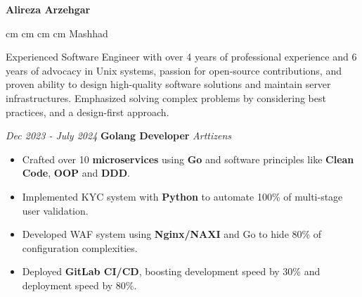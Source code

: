 \documentclass{engineercv}
\begin{document}
\begin{center}
  \textbf{\fontsize{24 pt}{24 pt}\selectfont Alireza Arzehgar}

  \vspace{0.2 cm}

  \scriptsize
  \mbox{}
   cm
  \mbox{}
   cm
  \mbox{}
   cm
  \mbox{}
   cm
  \mbox{{\color{black}\footnotesize\faMapMarker*}\hspace*{0.13cm}Mashhad}
\end{center}


Experienced Software Engineer with over 4 years of professional experience and 6 years of advocacy in Unix systems,
passion for open-source contributions, and proven ability to design high-quality software solutions and
maintain server infrastructures. Emphasized solving complex problems by considering best practices, and a design-first approach.


\begin{twocolentry}{\textit{Dec 2023 - July 2024}}
  \textbf{Golang Developer}
  \textit{Arttizens}
\end{twocolentry}

\begin{itemize}
  \item Crafted over 10 \textbf{microservices} using \textbf{Go} and software principles
  like \textbf{Clean Code}, \textbf{OOP} and \textbf{DDD}.
  \item Implemented KYC system with \textbf{Python} to automate 100\% of multi-stage user validation.
  \item Developed WAF system using \textbf{Nginx/NAXI} and Go to hide 80\% of configuration complexities.
  \item Deployed \textbf{GitLab CI/CD}, boosting development speed by 30\% and deployment speed by 80\%.
\end{itemize}
\end{document}
